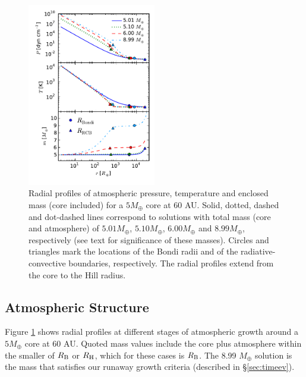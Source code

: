 \documentclass[apj, numberedappendix]{emulateapj}
\newcommand{\RB}{R_{\rm B}}
\newcommand{\RH}{R_{\rm H}}
\begin{document}
\begin{figure}[tb]
\centering
\includegraphics[width=0.5\textwidth]{../../figs/ModelAtmospheres/RadSelfGravPoly/PaperFigs/PTm_profiles_v2_smallM.pdf}
\caption{Radial profiles of atmospheric pressure, temperature and enclosed mass (core included) for a $5 M_{\oplus}$ core at $60$ AU.   Solid, dotted, dashed and dot-dashed lines correspond to solutions with total mass (core and atmosphere) of $5.01 M_{\oplus}$, $5.10 M_{\oplus}$, $6.00 M_{\oplus}$ and $8.99 M_{\oplus}$, respectively (see text for significance of these masses).  Circles and triangles mark the locations of the Bondi radii and of the radiative-convective boundaries, respectively.  The radial profiles extend from the core to the Hill radius.} %
\label{fig:profiles}
\end{figure}


\subsection{Atmospheric Structure}
\label{sec:profiles}
Figure \ref{fig:profiles} shows radial profiles at different stages of atmospheric growth around a $5 M_{\oplus}$ core at $60$ AU.  Quoted mass values include the core plus atmosphere within the smaller of $\RB$ or $\RH$, which for these cases is $\RB$.  The 8.99 $M_{\oplus}$ solution is the mass 
that satisfies our runaway growth criteria (described in \S\ref{sec:timeev}). %
\end{document}
